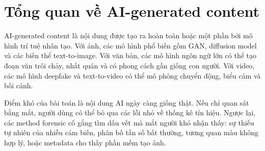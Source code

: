 \section{Tổng quan về AI-generated content}
AI-generated content là nội dung được tạo ra hoàn toàn hoặc một phần bởi mô hình trí tuệ nhân tạo. Với ảnh, các mô hình phổ biến gồm GAN, diffusion model và các biến thể text-to-image. Với văn bản, các mô hình ngôn ngữ lớn có thể tạo đoạn văn trôi chảy, nhất quán và có phong cách gần giống con người. Với video, các mô hình deepfake và text-to-video có thể mô phỏng chuyển động, biểu cảm và bối cảnh.

Điểm khó của bài toán là nội dung AI ngày càng giống thật. Nếu chỉ quan sát bằng mắt, người dùng có thể bỏ qua các lỗi nhỏ về thống kê tín hiệu. Ngược lại, các method forensic cố gắng tìm dấu vết mà mắt người khó nhận thấy: sự thiếu tự nhiên của nhiễu cảm biến, phân bố tần số bất thường, tương quan màu không hợp lý, hoặc metadata cho thấy phần mềm tạo ảnh.
